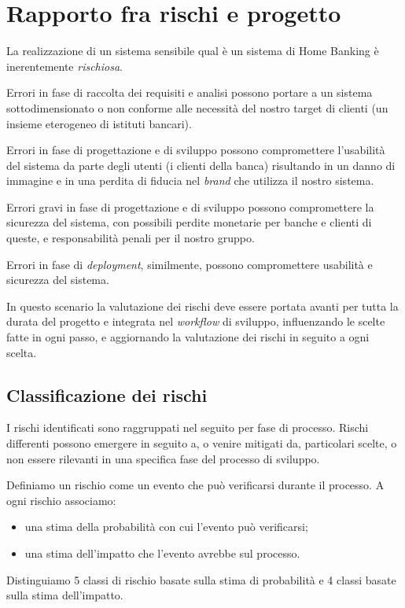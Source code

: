 \documentclass[10pt]{softeng} %
\begin{document}
\startofdocument{}

\section{Rapporto fra rischi e progetto}

La realizzazione di un sistema sensibile qual \`e un sistema di Home Banking \`e inerentemente \emph{rischiosa}.

Errori in fase di raccolta dei requisiti e analisi possono portare a un sistema sottodimensionato o non conforme alle necessit\`a del nostro target di clienti (un insieme eterogeneo di istituti bancari).

Errori in fase di progettazione e di sviluppo possono compromettere l'usabilit\`a del sistema da parte degli utenti (i clienti della banca) risultando in un danno di immagine e in una perdita di fiducia nel \emph{brand} che utilizza il nostro sistema.

Errori gravi in fase di progettazione e di sviluppo possono compromettere la sicurezza del sistema, con possibili perdite monetarie per banche e clienti di queste, e responsabilit\`a penali per il nostro gruppo.

Errori in fase di \emph{deployment}, similmente, possono compromettere usabilit\`a e sicurezza del sistema.

In questo scenario la valutazione dei rischi deve essere portata avanti per tutta la durata del progetto e integrata nel \emph{workflow} di sviluppo, influenzando le scelte fatte in ogni passo, e aggiornando la valutazione dei rischi in seguito a ogni scelta.

\subsection{Classificazione dei rischi}

I rischi identificati sono raggruppati nel seguito per fase di processo.
Rischi differenti possono emergere in seguito a, o venire mitigati da, particolari scelte, o non essere rilevanti in una specifica fase del processo di sviluppo.

Definiamo un rischio come un evento che pu\`o verificarsi durante il processo.
A ogni rischio associamo:
\begin{itemize}
	\item una stima della probabilit\`a con cui l'evento pu\`o verificarsi;
	\item una stima dell'impatto che l'evento avrebbe sul processo.
\end{itemize}
Distinguiamo 5 classi di rischio basate sulla stima di probabilit\`a e 4 classi basate sulla stima dell'impatto.
\end{document}
